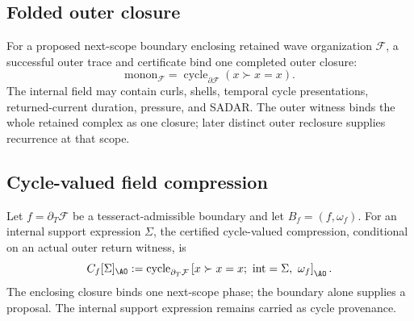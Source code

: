 \subsection{Folded outer closure}
\label{subsec:field-as-monon-compression}
For a proposed next-scope boundary enclosing retained wave organization \(\mathcal F\), a successful outer trace and certificate bind one completed outer closure:
\[
\mathrm{monon}_{\mathcal F}=\operatorname{cycle}_{\partial\mathcal F}(x\succ x=x).
\]
The internal field may contain curls, shells, temporal cycle presentations, returned-current duration, pressure, and SADAR. The outer witness binds the whole retained complex as one closure; later distinct outer reclosure supplies recurrence at that scope.


\subsection{Cycle-valued field compression}
\label{subsec:cycle-valued-field-compression}
\begin{definition}
Let \(f=\partial_T\mathcal F\) be a tesseract-admissible boundary and let \(B_f=(f,\omega_f)\). For an internal support expression \(\Sigma\), the certified cycle-valued compression, conditional on an actual outer return witness, is
\begin{equation}
C_f[\Sigma]_{\AO}
:=
\operatorname{cycle}_{\partial_T\mathcal F}
\left[
  x\succ x=x;\ \operatorname{int}=\Sigma,\ \omega_f
\right]_{\AO}.
\label{eq:cycle-valued-field-compression}
\end{equation}
The enclosing closure binds one next-scope phase; the boundary alone supplies a proposal. The internal support expression remains carried as cycle provenance.
\end{definition}


